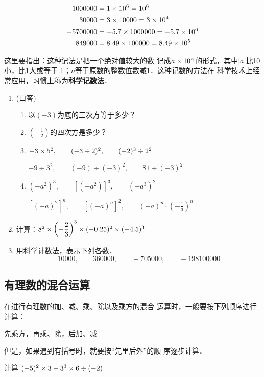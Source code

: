 \begin{solution}
	\[\begin{split}
	1000000 &=1\times 10^6=10^6\\ 
	30000  &=3\times 10000=3\times 10^4\\
	-5700000 &=-5.7\times 1000000=-5.7\times 10^6\\
	849000    &=8.49\times 100000=8.49\times 10^5
	\end{split}\]
\end{solution}

这里要指出：这种记法是把一个绝对值较大的数
记成$a\times10^n$的形式，其中$|a|$比10小，比1大或等于
1；$n$等于原数的整数位数减1．这种记数的方法在
科学技术上经常应用，习惯上称为\textbf{科学记数法}．


\begin{ex}
	\begin{enumerate}
		\item (口答)
		\begin{enumerate}
			\item 以$(- 3)$为底的三次方等于多少？
			\item $\left(-\frac{1}{2}\right)$的四次方是多少？
			\item $-3\times 5^2,\qquad (-3\div 2)^2,\qquad (-2)^3\div 2^2$
			
			$-9\div 3^2,\qquad (-9)\div (-3)^2,\qquad 81\div (-3)^2$
			\item $(-a^2)^3,\qquad [(-a^2)]^3,\qquad (-a^3)^2$
			
			$[(-a)^2]^n,\qquad [(-a)^n]^2,\qquad (-a)^n\cdot \left(-\frac{1}{a}\right)^n$
		\end{enumerate}   
		\item 计算：$8^2\times \left(-\dfrac{2}{3}\right)^3\times(-0.25)^2\times (-4.5)^3$
		\item 用科学计数法，表示下列各数．
		\[10000,\qquad 360000,\qquad -705000,\qquad -198100000  \]
	\end{enumerate}
\end{ex}

\subsection{有理数的混合运算}
在进行有理数的加、减、乘、除以及乘方的混合
运算时，一般要按下列顺序进行计算：
\begin{center}
	先乘方，再乘、除，后加、减  
\end{center}
但是，如果遇到有括号时，就要按“先里后外”的顺
序逐步计算．




\begin{example}
	计算 $(-5)^2\times 3-3^3\times 6\div (-2)$
\end{example}

